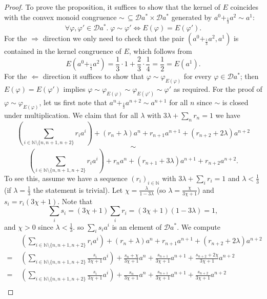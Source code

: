 \documentclass[a4paper, UKenglish, numberwithinsect, thm-restate, cleveref, final]{lipics-v2021}
\theoremstyle{plain}
\theoremstyle{definition}
\newcommand{\D}{\ensuremath{\mathcal{D}}}
\newcommand{\N}{\ensuremath{\mathds{N}}}
\numberwithin{equation}{section}
\begin{document}
\begin{proof}
To prove the proposition, it suffices to show that the kernel of $E$ coincides with the convex monoid congruence $\sim\,\subseteq \D a^* \times \D a^*$ generated by $a^{0} +_{\frac{1}{3}} a^{2} \sim a^{1}$:
\[ \forall \varphi,\varphi'\in \D a^*.\; \varphi \sim \varphi'\iff E(\varphi)=E(\varphi'). \]
For the $\Rightarrow$ direction we only need to check that the pair  $(a^{0} +_{\frac{1}{3}} a^{2}, a^{1})$ is contained in the kernel congruence of $E$, which follows from
\[ E(a^0+_{\frac{1}{3}} a^2) = \frac{1}{3}\cdot 1 + \frac{2}{3}\cdot \frac{1}{4} = \frac{1}{2} = E(a^1).\]
For the $\Leftarrow$ direction it suffices to show that $\varphi \sim \varphi_{E(\varphi)}$ for every $\varphi\in \D a^*$; then $E(\varphi)=E(\varphi')$ implies $\varphi \sim \varphi_{E(\varphi)} \sim \varphi_{E(\varphi')} \sim \varphi'$ as required.
For the proof of \(\varphi \sim \varphi_{E(\varphi)}\), let us first note that
 \(a^{n} +_{\frac{1}{3}} a^{n+2} \sim a^{n+1}\) for all $n$ since $\sim$ is closed under multiplication.
 We claim that for all \(\lambda\) with \(3\lambda + \sum_{n}r_{n} = 1\) we have
  \[(\sum_{i \in \N \setminus \{n, n+1, n+2\}} r_{i}a^{i}) + (r_{n} + \lambda)a^{n} + r_{n+1}a^{n+1} + (r_{n+2} + 2 \lambda) a^{n+2}\]
  \begin{equation}\label{eq:game-rule} \sim \end{equation}
  \[(\sum_{i \in \N \setminus \{n, n+1, n+2\}} r_{i}a^{i}) + r_{n}a^{n} + (r_{n+1} + 3 \lambda)a^{n+1} + r_{n+2} a^{n+2}.\]
  To see this, assume we have a  sequence \((r_{i})_{i \in \mathbb{N}}\) with \(3 \lambda  + \sum_{i}r_{i} = 1\) and \(\lambda < \frac{1}{3}\) (if \(\lambda = \frac{1}{3}\) the statement is trivial).
  Let \(\chi = \frac{\lambda}{1 - 3 \lambda}\) (so \(\lambda = \frac{\chi}{3 \chi + 1}\)) and \(s_{i} = r_{i}(3 \chi + 1)\).
  Note that
  \[\sum_{i} s_{i} = (3 \chi + 1) \sum_{i} r_{i} = (3 \chi + 1)(1 - 3 \lambda) = 1, \]
  and \(\chi > 0\) since \(\lambda < \frac{1}{3}\).
  so \(\sum_{i}s_{i}a^{i}\) is an element of \(\mathcal{D} a^{*}\).
  We compute
  \begin{align*}
    & (\sum_{i \in \N \setminus \{n, n+1, n+2\}} r_{i}a^{i}) + (r_{n} + \lambda)a^{n} + r_{n+1}a^{n+1} + (r_{n+2} + 2 \lambda) a^{n+2} \\
    =\,\,& (\sum_{i \in \N \setminus \{n, n+1, n+2\}} \frac{s_{i}}{3 \chi + 1}a^{i}) + \frac{s_{n} + \chi}{3 \chi + 1}a^{n} + \frac{s_{n+1}}{3 \chi + 1}a^{n+1} + \frac{s_{n+2} + 2 \chi}{3 \chi + 1} a^{n+2} \\
    =\,\,& (\sum_{i \in \N \setminus \{n, n+1, n+2\}} \frac{s_{i}}{3 \chi + 1}a^{i}) + \frac{s_{n}}{3 \chi + 1}a^{n} + \frac{s_{n+1}}{3 \chi + 1}a^{n+1} + \frac{s_{n+2}}{3 \chi + 1}a^{n+2} \\

\end{align*}
\end{proof}
\end{document}
